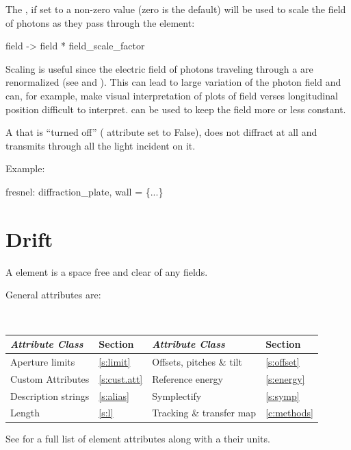 The , if set to a non-zero value (zero is the
default) will be used to scale the field of photons as they pass through
the  element:
\begin{example}
  field -> field * field_scale_factor
\end{example}
Scaling is useful since the electric field of photons traveling through a
 are renormalized (see  and
). This can lead to large variation of the photon field and
can, for example, make visual interpretation of plots of field verses
longitudinal position difficult to interpret. 
can be used to keep the field more or less constant.

A  that is ``turned off'' ( attribute
set to False), does not diffract at all and transmits through all
the light incident on it.

Example:
\begin{example}
  fresnel: diffraction_plate, wall = \{...\}
\end{example}

\newpage

\section{Drift}
\label{s:drift}

A  element is a space free and clear of any fields.

General  attributes are:
\begin{center}
\tt
\begin{tabular}{llll} \toprule
  {\sl Attribute Class}      & Section          & {\sl Attribute Class}      & Section         \\ \midrule
  Aperture limits            & \ref{s:limit}    & Offsets, pitches \& tilt   & \ref{s:offset}  \\
  Custom Attributes          & \ref{s:cust.att} & Reference energy           & \ref{s:energy}  \\ 
  Description strings        & \ref{s:alias}    & Symplectify                & \ref{s:symp}    \\ 
  Length                     & \ref{s:l}        & Tracking \& transfer map   & \ref{c:methods} \\ 
  \bottomrule
\end{tabular}
\end{center}
\toffset
See  for a full list of element attributes along with a their units.

